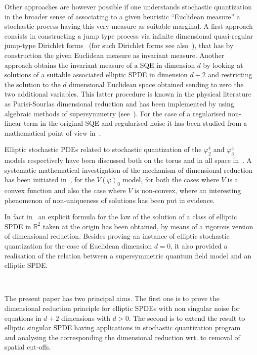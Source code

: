 \documentclass[a4paper,10pt]{article}
\begin{document}
Other approaches are however possible if one understands stochastic
quantization in the broader sense of associating to a given heuristic
``Euclidean measure'' a stochastic process having this very measure as
suitable marginal. A first approach consists in constructing a jump type
process via infinite dimensional quasi-regular jump-type Dirichlet
forms~{\cite{Yoshida,Albeverio2002,Yoshida2008,Yoshida2010}} (for such
Dirichlet forms see also~{\cite{ARu}}), that has by construction the given
Euclidean measure as invariant measure. Another approach obtains the invariant
measure of a SQE in dimension $d$ by looking at solutions of a suitable
associated elliptic SPDE in dimension $d + 2$ and restricting the solution to
the $d$ dimensional Euclidean space obtained sending to zero the two
additional variables. This latter procedure is known in the physical
literature as Parisi-Sourlas dimensional reduction and has been implemented by
using algebraic methods of supersymmetry (see~{\cite{parisi_random_1979}}).
For the case of a regularised non-linear term in the original SQE and
regularised noise it has been studied from a mathematical point of view
in~{\cite{Klein1984}}.

Elliptic stochastic PDEs related to stochastic quantization of the
$\varphi_2^4$ and $\varphi_3^4$ models respectively have been discussed both
on the torus and in all space in~{\cite{GH18}}. A systematic mathematical
investigation of the mechanism of dimensional reduction has been initiated
in~{\cite{Albeverio2018elliptic}}, for the $V (\varphi)_0$ model, for both the
cases where $V$ is a convex function and also the case where $V$ is
non-convex, where an interesting phenomenon of non-uniqueness of solutions has
been put in evidence.

In fact in~{\cite{Albeverio2018elliptic}} an explicit formula for the law of
the solution of a class of elliptic SPDE in $\mathbb{R}^2$ taken at the origin
has been obtained, by means of a rigorous version of dimensional reduction.
Besides proving an instance of elliptic stochastic quantization for the case
of Euclidean dimension $d = 0$, it also provided a realisation of the relation
between a supersymmetric quantum field model and an elliptic SPDE.

\

The present paper has two principal aims. The first one is to prove the
dimensional reduction principle for elliptic SPDEs with non singular noise for
equations in $d + 2$ dimensions with $d > 0$. The second is to extend the
result to elliptic singular SPDE having applications in stochastic
quantization program and analysing the corresponding the dimensional reduction
wrt. to removal of spatial cut-offs.
\end{document}
